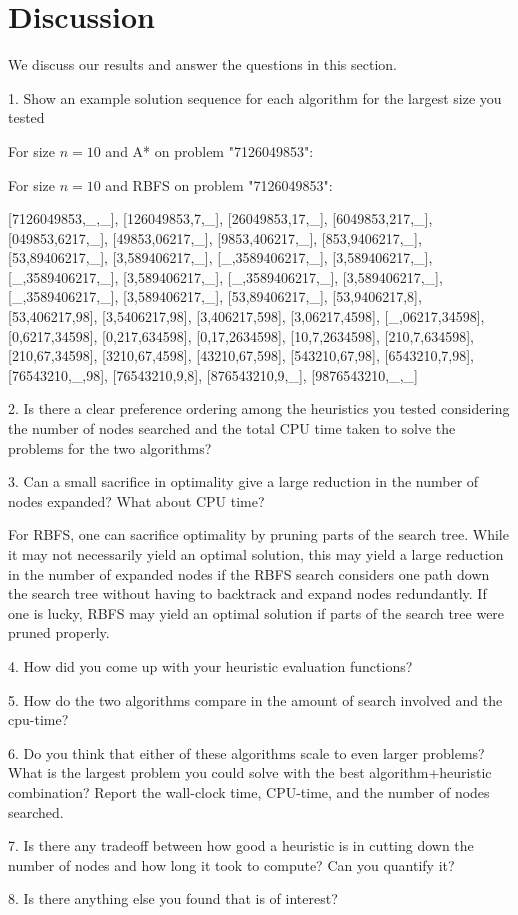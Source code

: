 \section{Discussion}

We discuss our results and answer the questions in this section.

1. Show an example solution sequence for each algorithm for the largest size you tested

For size $n = 10$ and A* on problem "7126049853":



For size $n = 10$ and RBFS on problem "7126049853":

[7126049853,\_,\_], [126049853,7,\_], [26049853,17,\_], [6049853,217,\_], [049853,6217,\_], [49853,06217,\_], [9853,406217,\_], [853,9406217,\_], [53,89406217,\_], [3,589406217,\_], [\_,3589406217,\_], [3,589406217,\_], [\_,3589406217,\_], [3,589406217,\_], [\_,3589406217,\_], [3,589406217,\_], [\_,3589406217,\_], [3,589406217,\_], [53,89406217,\_], [53,9406217,8], [53,406217,98], [3,5406217,98], [3,406217,598], [3,06217,4598], [\_,06217,34598], [0,6217,34598], [0,217,634598], [0,17,2634598], [10,7,2634598], [210,7,634598], [210,67,34598], [3210,67,4598], [43210,67,598], [543210,67,98], [6543210,7,98], [76543210,\_,98], [76543210,9,8], [876543210,9,\_], [9876543210,\_,\_]

2. Is there a clear preference ordering among the heuristics you tested considering the number of nodes searched and the total CPU time taken to solve the problems for the two algorithms?

3. Can a small sacrifice in optimality give a large reduction in the number of nodes expanded? What about CPU time?

For RBFS, one can sacrifice optimality by pruning parts of the search tree. While it may not necessarily yield an optimal solution, this may yield a large reduction in the number of expanded nodes if the RBFS search considers one path down the search tree without having to backtrack and expand nodes redundantly. If one is lucky, RBFS may yield an optimal solution if parts of the search tree were pruned properly.

4. How did you come up with your heuristic evaluation functions?

5. How do the two algorithms compare in the amount of search involved and the cpu-time?

6. Do you think that either of these algorithms scale to even larger problems? What is the largest problem you could solve with the best algorithm+heuristic combination? Report the wall-clock time, CPU-time, and the number of nodes searched.

7. Is there any tradeoff between how good a heuristic is in cutting down the number of nodes and how long it took to compute? Can you quantify it?

8. Is there anything else you found that is of interest?


